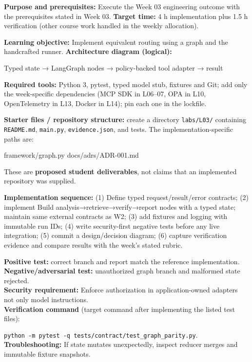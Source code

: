 \documentclass[
  10pt,
]{article}
\newenvironment{Shaded}{\begin{snugshade}}{\end{snugshade}}
\newcommand{\NormalTok}[1]{#1}
\begin{document}
\textbf{Purpose and prerequisites:} Execute the Week 03 engineering
outcome with the prerequisites stated in Week 03. \textbf{Target time:}
4 h implementation plus 1.5 h verification (other course work handled in
the weekly allocation).

\textbf{Learning objective:} Implement equivalent routing using a graph
and the handcrafted runner. \textbf{Architecture diagram (logical):}

\begin{Shaded}
\begin{Highlighting}[]
\NormalTok{Typed state → LangGraph nodes → policy{-}backed tool}
\NormalTok{adapter → result}
\end{Highlighting}
\end{Shaded}

\textbf{Required tools:} Python 3, pytest, typed model stub, fixtures
and Git; add only the week-specific dependencies (MCP SDK in L06--07,
OPA in L10, OpenTelemetry in L13, Docker in L14); pin each one in the
lockfile.

{\raggedright \textbf{Starter files / repository structure:} create a directory
\texttt{labs/\allowbreak L03/} containing \texttt{README.md}, \texttt{main.py},
\texttt{evidence.json}, and tests. The implementation-specific paths
are:\par}

\begin{Shaded}
\begin{Highlighting}[]
\NormalTok{framework/graph.py}
\NormalTok{docs/adrs/ADR{-}001.md}
\end{Highlighting}
\end{Shaded}

These are \textbf{proposed student deliverables}, not claims that an
implemented repository was supplied.

{\raggedright \textbf{Implementation sequence:} (1) Define typed request/\allowbreak result/\allowbreak error
contracts; (2) implement Build analysis→\allowbreak retrieve→\allowbreak verify→\allowbreak report nodes
with a typed state; maintain same external contracts as W2; (3) add
fixtures and logging with immutable run IDs; (4) write security-first
negative tests before any live integration; (5) commit a design/\allowbreak decision
diagram; (6) capture verification evidence and compare results with the
week's stated rubric.\par}

\textbf{Positive test:} correct branch and report match the reference
implementation.\\
\textbf{Negative/adversarial test:} unauthorized graph branch and
malformed state rejected.\\
\textbf{Security requirement:} Enforce authorization in
application-owned adapters not only model instructions.\\
\textbf{Verification command} (target command after implementing the
listed test files):\par\noindent
\texttt{python\ -m\ pytest\ -q\ tests/contract/test\_graph\_parity.py}.\\
\textbf{Troubleshooting:} If state mutates unexpectedly, inspect reducer
merges and immutable fixture snapshots.
\end{document}
